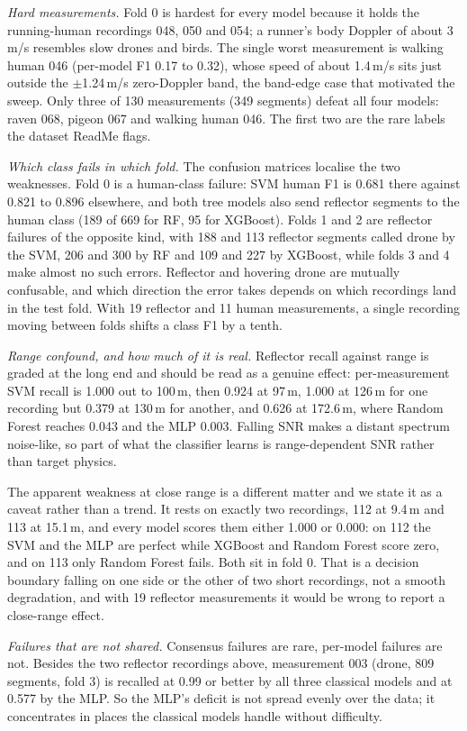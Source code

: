 \documentclass[conference]{IEEEtran}
\begin{document}
\emph{Hard measurements.} Fold 0 is hardest for every model because it holds the running-human recordings 048, 050 and 054; a runner's body Doppler of about 3\,m/s resembles slow drones and birds. The single worst measurement is walking human 046 (per-model F1 0.17 to 0.32), whose speed of about 1.4\,m/s sits just outside the $\pm$1.24\,m/s zero-Doppler band, the band-edge case that motivated the sweep. Only three of 130 measurements (349 segments) defeat all four models: raven 068, pigeon 067 and walking human 046. The first two are the rare labels the dataset ReadMe flags.

\emph{Which class fails in which fold.} The confusion matrices localise the two weaknesses. Fold 0 is a human-class failure: SVM human F1 is 0.681 there against 0.821 to 0.896 elsewhere, and both tree models also send reflector segments to the human class (189 of 669 for RF, 95 for XGBoost). Folds 1 and 2 are reflector failures of the opposite kind, with 188 and 113 reflector segments called drone by the SVM, 206 and 300 by RF and 109 and 227 by XGBoost, while folds 3 and 4 make almost no such errors. Reflector and hovering drone are mutually confusable, and which direction the error takes depends on which recordings land in the test fold. With 19 reflector and 11 human measurements, a single recording moving between folds shifts a class F1 by a tenth.

\emph{Range confound, and how much of it is real.} Reflector recall against range is graded at the long end and should be read as a genuine effect: per-measurement SVM recall is 1.000 out to 100\,m, then 0.924 at 97\,m, 1.000 at 126\,m for one recording but 0.379 at 130\,m for another, and 0.626 at 172.6\,m, where Random Forest reaches 0.043 and the MLP 0.003. Falling SNR makes a distant spectrum noise-like, so part of what the classifier learns is range-dependent SNR rather than target physics.

The apparent weakness at close range is a different matter and we state it as a caveat rather than a trend. It rests on exactly two recordings, 112 at 9.4\,m and 113 at 15.1\,m, and every model scores them either 1.000 or 0.000: on 112 the SVM and the MLP are perfect while XGBoost and Random Forest score zero, and on 113 only Random Forest fails. Both sit in fold 0. That is a decision boundary falling on one side or the other of two short recordings, not a smooth degradation, and with 19 reflector measurements it would be wrong to report a close-range effect.

\emph{Failures that are not shared.} Consensus failures are rare, per-model failures are not. Besides the two reflector recordings above, measurement 003 (drone, 809 segments, fold 3) is recalled at 0.99 or better by all three classical models and at 0.577 by the MLP. So the MLP's deficit is not spread evenly over the data; it concentrates in places the classical models handle without difficulty.
\end{document}
